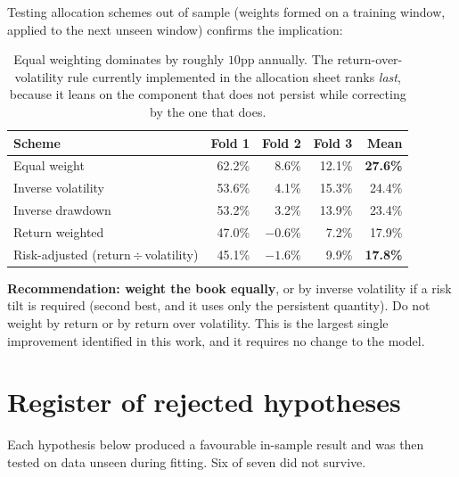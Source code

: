 \documentclass[11pt]{article}
\begin{document}
Testing allocation schemes out of sample (weights formed on a training window, applied to the
next unseen window) confirms the implication:

\begin{table}[H]\centering\small
\renewcommand{\arraystretch}{1.15}
\begin{tabular}{l r r r r}
\toprule
\textbf{Scheme} & \textbf{Fold 1} & \textbf{Fold 2} & \textbf{Fold 3} & \textbf{Mean}\\
\midrule
\rowcolor{bckeep} Equal weight & 62.2\% & 8.6\% & 12.1\% & \textbf{27.6\%}\\
Inverse volatility & 53.6\% & 4.1\% & 15.3\% & 24.4\%\\
Inverse drawdown & 53.2\% & 3.2\% & 13.9\% & 23.4\%\\
Return weighted & 47.0\% & $-0.6\%$ & 7.2\% & 17.9\%\\
\rowcolor{bcbad} Risk-adjusted (return\,$\div$\,volatility) & 45.1\% & $-1.6\%$ & 9.9\% & \textbf{17.8\%}\\
\bottomrule
\end{tabular}
\caption*{\footnotesize Equal weighting dominates by roughly $10$pp annually. The
return-over-volatility rule currently implemented in the allocation sheet ranks \emph{last},
because it leans on the component that does not persist while correcting by the one that does.}
\end{table}

\textbf{Recommendation: weight the book equally}, or by inverse volatility if a risk tilt is
required (second best, and it uses only the persistent quantity). Do not weight by return or by
return over volatility. This is the largest single improvement identified in this work, and it
requires no change to the model.

\section{Register of rejected hypotheses}

Each hypothesis below produced a favourable in-sample result and was then tested on data unseen
during fitting. Six of seven did not survive.
\end{document}
